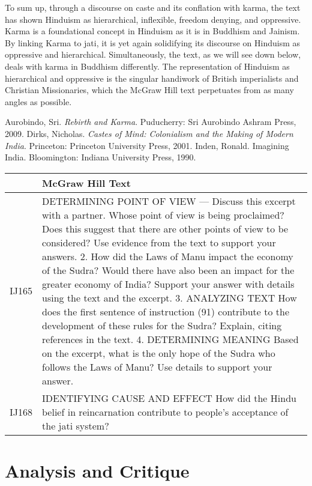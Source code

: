 To sum up, through a discourse on caste and its conflation with karma, the text has shown Hinduism as hierarchical, inflexible, freedom denying, and oppressive. Karma is a foundational concept in Hinduism as it is in Buddhism and Jainism. By linking Karma to jati, it is yet again solidifying its discourse on Hinduism as oppressive and hierarchical. Simultaneously, the text, as we will see down below, deals with karma in Buddhism differently. The representation of Hinduism as hierarchical and oppressive is the singular handiwork of British imperialists and Christian Missionaries, which the McGraw Hill text perpetuates from as many angles as possible.

\begin{thebibliography}{99}
 Aurobindo, Sri. \textit{Rebirth and Karma}. Puducherry: Sri Aurobindo Ashram Press, 2009.
 Dirks, Nicholas. \textit{Castes of Mind: Colonialism and the Making of Modern India}. Princeton: Princeton University Press, 2001.
 Inden, Ronald. Imagining India. Bloomington: Indiana University Press, 1990.
\end{thebibliography}

\begin{longtable}{|>{\raggedleft}p{1.5cm}|p{8.5cm}|}
\multicolumn{2}{|c|{\textbf{Table: 8}} 
\hline
\multicolumn{1}{|l|}{\textbf{Page #}} & \multicolumn{1}{|l|}{\textbf{McGraw Hill Text}} \tabularnewline
\hline
IJ165 & DETERMINING POINT OF VIEW — Discuss this excerpt with a partner. Whose point of view is being proclaimed? Does this suggest that there are other points of view to be considered? Use evidence from the text to support your answers. 2. How did the Laws of Manu impact the economy of the Sudra? Would there have also been an impact for the greater economy of India? Support your answer with details using the text and the excerpt. 3. ANALYZING TEXT How does the first sentence of instruction (91) contribute to the development of these rules for the Sudra? Explain, citing references in the text. 4. DETERMINING MEANING Based on the excerpt, what is the only hope of the Sudra who follows the Laws of Manu? Use details to support your answer. \tabularnewline
\hline
IJ168 & IDENTIFYING CAUSE AND EFFECT How did the Hindu belief in reincarnation contribute to people’s acceptance of the jati system? \tabularnewline
\hline
\end{longtable}

\section*{Analysis and Critique} 

